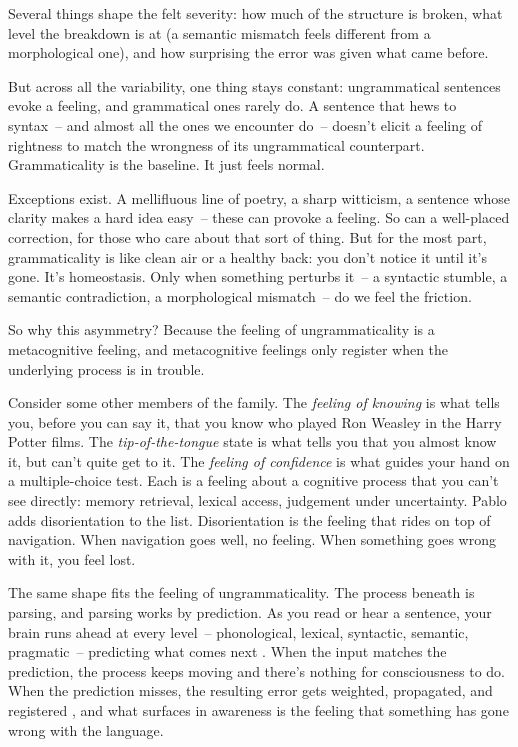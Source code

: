 \ea\label{ex:green-cheese}
    \z
\z

Several things shape the felt severity: how much of the structure is broken, what level the breakdown is at (a semantic mismatch feels different from a morphological one), and how surprising the error was given what came before.

But across all the variability, one thing stays constant: ungrammatical sentences evoke a feeling, and grammatical ones rarely do. A sentence that hews to syntax~-- and almost all the ones we encounter do~-- doesn't elicit a feeling of rightness to match the wrongness of its ungrammatical counterpart. Grammaticality is the baseline. It just feels normal.

Exceptions exist. A mellifluous line of poetry, a sharp witticism, a sentence whose clarity makes a hard idea easy~-- these can provoke a feeling. So can a well-placed correction, for those who care about that sort of thing. But for the most part, grammaticality is like clean air or a healthy back: you don't notice it until it's gone. It's homeostasis. Only when something perturbs it~-- a syntactic stumble, a semantic contradiction, a morphological mismatch~-- do we feel the friction.

So why this asymmetry? Because the feeling of ungrammaticality is a metacognitive feeling, and metacognitive feelings only register when the underlying process is in trouble.

Consider some other members of the family. The \emph{feeling of knowing} is what tells you, before you can say it, that you know who played Ron Weasley in the Harry Potter films. The \emph{tip-of-the-tongue} state is what tells you that you almost know it, but can't quite get to it. The \emph{feeling of confidence} is what guides your hand on a multiple-choice test. Each is a feeling about a cognitive process that you can't see directly: memory retrieval, lexical access, judgement under uncertainty. Pablo \textcite{FernandezVelasco2021} adds disorientation to the list. Disorientation is the feeling that rides on top of navigation. When navigation goes well, no feeling. When something goes wrong with it, you feel lost.

The same shape fits the feeling of ungrammaticality. The process beneath is parsing, and parsing works by prediction. As you read or hear a sentence, your brain runs ahead at every level~-- phonological, lexical, syntactic, semantic, pragmatic~-- predicting what comes next \citep{Clark2013,Kuperberg2016}. When the input matches the prediction, the process keeps moving and there's nothing for consciousness to do. When the prediction misses, the resulting error gets weighted, propagated, and registered \citep{Rabovsky2018}, and what surfaces in awareness is the feeling that something has gone wrong with the language.

